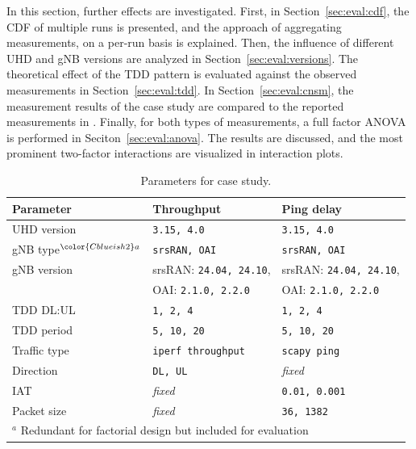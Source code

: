 In this section, further effects are investigated.
First, in Section~\ref{sec:eval:cdf}, the \gls{CDF} of multiple runs is presented, and the approach of aggregating measurements, on a per-run basis is explained.
Then, the influence of different \gls{UHD} and \gls{gNB} versions are analyzed in Section~\ref{sec:eval:versions}.
The theoretical effect of the \gls{TDD} pattern is evaluated against the observed measurements in Section~\ref{sec:eval:tdd}.
In Section~\ref{sec:eval:cnsm}, the measurement results of the case study are compared to the reported measurements in \cite{raffeck2024parameterizing}.
Finally, for both types of measurements, a full factor \gls{ANOVA} is performed in Seciton~\ref{sec:eval:anova}.
The results are discussed, and the most prominent two-factor interactions are visualized in interaction plots.



\begin{table}[htb]
\centering
\caption{Parameters for case study.}
\label{table:eval:parameters}
\begin{tabular}{l | l | l}
    \toprule
    Parameter & Throughput & Ping delay \\
    \midrule
    \gls{UHD} version       & \texttt{3.15, 4.0}                & \texttt{3.15, 4.0} \\
    \gls{gNB} type$^{\color{Cblueish2}a}$     & \texttt{srsRAN, OAI}              & \texttt{srsRAN, OAI}  \\
    \gls{gNB} version       & srsRAN: \texttt{24.04, 24.10},    & srsRAN: \texttt{24.04, 24.10}, \\
                            & OAI: \texttt{2.1.0, 2.2.0}        & OAI: \texttt{2.1.0, 2.2.0} \\
    \gls{TDD} DL:UL         & \texttt{1, 2, 4}                  & \texttt{1, 2, 4} \\
    \gls{TDD} period        & \texttt{5, 10, 20}                & \texttt{5, 10, 20} \\
    Traffic type            & \texttt{iperf throughput}         & \texttt{scapy ping} \\
    Direction               & \texttt{DL, UL}                   & \textit{fixed} \\
    \gls{IAT}               & \textit{fixed}                    & \texttt{0.01, 0.001} \\
    Packet size             & \textit{fixed}                    & \texttt{36, 1382} \\
    \multicolumn{3}{l}{\footnotesize {\color{Cblueish2}${}^a$} Redundant for factorial design but included for evaluation} \\

\end{tabular}
\end{table}




